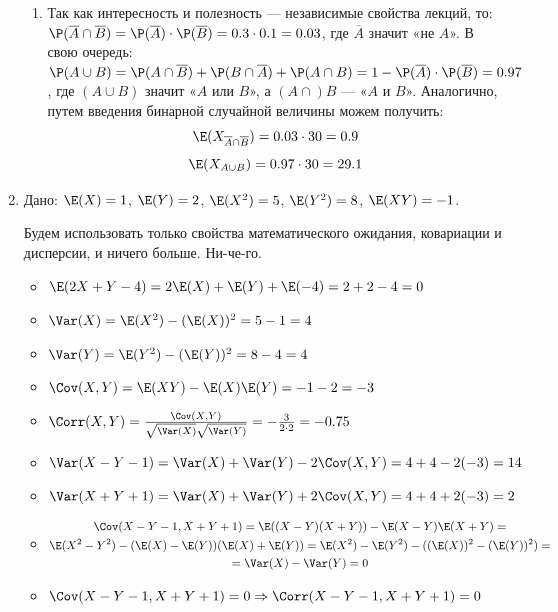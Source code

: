 \begin{enumerate}
\begin{enumerate}
\item Так как интересность и полезность — независимые свойства лекций, то:\\
 $\P(\overline{A} \cap \overline{B}) = \P(\overline{A})\cdot \P(\overline{B}) = 0.3\cdot0.1 = 0.03$, где $\overline{A}$ значит «не $A$». В свою очередь:\\
 $\P(A\cup B) = \P(A\cap\overline{B}) + \P(B\cap\overline{A}) + \P(A\cap B) = 1 - \P(\overline{A})\cdot \P(\overline{B}) = 0.97$ , где $(A\cup B)$ значит «$A$ или $B$», а $(A\cap)B$ — «$A$ и $B$». Аналогично, путем введения бинарной случайной величины можем получить:
 \[
 \E(X_{\overline{A} \cap \overline{B}}) = 0.03 \cdot  30 = 0.9
 \]
 \[
 \E(X_{A\cup B}) = 0.97\cdot30 = 29.1
\]

\end{enumerate}

\item
Дано: $\E(X) = 1$, $\E(Y) = 2$, $\E(X^2) = 5$, $\E(Y^2) = 8$, $\E(XY) = -1$.

Будем использовать только свойства математического ожидания, ковариации и дисперсии, и ничего больше. Ни-че-го.

\begin{itemize}
\item  $\E(2X + Y - 4) = 2\E(X) + \E(Y) + \E(-4) = 2 + 2 - 4 = 0 $
\item $\Var(X) = \E(X^2) - (\E(X))^2 = 5 - 1 = 4 $
\item $\Var(Y) = \E(Y^2) - (\E(Y))^2 = 8 - 4 = 4 $
\item $\Cov(X, Y) = \E(XY) - \E(X)\E(Y) = -1 - 2 = -3$
\item $\Corr(X, Y) = \frac{\Cov(X, Y)}{\sqrt{\Var(X)}\sqrt{\Var(Y)}} = -\frac{3}{2\cdot 2} = -0.75$
\item $\Var(X-Y-1) = \Var(X) + \Var(Y) - 2\Cov(X, Y) = 4+4 -2(-3) = 14$
\item $\Var(X+Y+1) = \Var(X) + \Var(Y) + 2\Cov(X, Y) = 4+4+2(-3) =2 $
\item \begin{multline}
\Cov(X-Y-1, X+Y+1)=\E((X-Y)(X+Y))-\E(X-Y)\E(X+Y) = \\
\E(X^2-Y^2) - (\E(X)-\E(Y))(\E(X) + \E(Y)) =
\E(X^2) - \E(Y^2) - ((\E(X))^2 -(\E(Y))^2)=\\
 = \Var(X)-\Var(Y) = 0
 \end{multline}
 \item $\Cov(X-Y-1, X+Y+1)=0 \Rightarrow \Corr(X-Y-1, X+Y+1) = 0 $
\end{itemize}


\end{enumerate}
